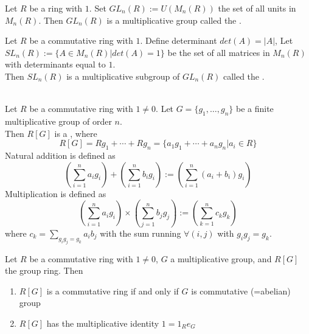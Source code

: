 \begin{definition}
Let $R$ be a ring with $1$. Set $GL_n(R) := U(M_n(R))$ the set of all units in $M_n(R)$. Then $GL_n(R)$ is a multiplicative group called the .
\end{definition}


\begin{definition}
Let $R$ be a commutative ring with $1$. Define determinant $det(A) = \left| A \right|$, Let $SL_n(R) := \{A \in M_n(R) | det(A) = 1\}$ be the set of all matrices in $M_n(R)$ with determinants equal to $1$. \\
Then $SL_n(R)$ is a multiplicative subgroup of $GL_n(R)$ called the .
\end{definition}


\begin{definition}
\\
Let $R$	be a commutative ring with $1 \neq 0$. Let $G = \{g_1, \ldots, g_n\}$ be a finite multiplicative group of order $n$.\\
Then $R[G]$ is a , where 
\begin{equation}
R[G] = Rg_1 + \cdots + Rg_n = \{a_1 g_1 + \cdots + a_n g_n | a_i \in R\} \nonumber	
\end{equation}
Natural addition is defined as 
\begin{equation}
(\sum_{i=1}^{n} a_i g_i)+ (\sum_{i=1}^{n} b_i g_i) := (\sum_{i=1}^{n} (a_i + b_i) g_i) \nonumber
\end{equation}
Multiplication is defined as 
\begin{equation}
(\sum_{i=1}^{n} a_i g_i) \times (\sum_{j=1}^{n} b_j g_j) := (\sum_{k=1}^{n} c_k g_k) \nonumber
\end{equation}
where $c_k=\sum_{g_i g_j = g_k} a_i b_j$ with the sum running $\forall (i, j)$ with $g_i g_j = g_k$.\\
\end{definition}


\begin{remark}
Let $R$ be a commutative ring with $1 \neq 0$, $G$ a multiplicative group, and $R[G]$ the group ring. Then
\begin{enumerate}[label=(\roman*)]
\item $R[G]$ is a commutative ring if and only if $G$ is commutative (=abelian) group
\item $R[G]$ has the multiplicative identity $1=1_R e_G$
\end{enumerate}
\end{remark}



